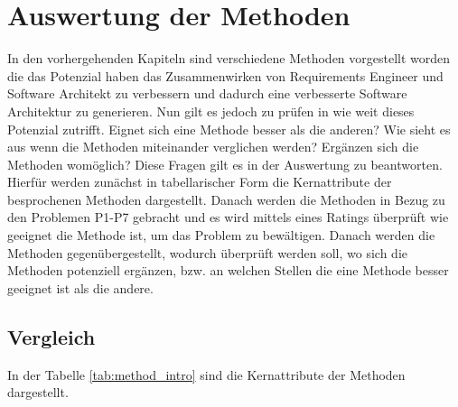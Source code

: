 \section{Auswertung der Methoden}\label{auswertung}
In den vorhergehenden Kapiteln sind verschiedene Methoden vorgestellt worden die das Potenzial haben das Zusammenwirken von Requirements Engineer und Software Architekt zu verbessern und dadurch eine verbesserte Software Architektur zu generieren. Nun gilt es jedoch zu prüfen in wie weit dieses Potenzial zutrifft. Eignet sich eine Methode besser als die anderen? Wie sieht es aus wenn die Methoden miteinander verglichen werden? Ergänzen sich die Methoden womöglich? Diese Fragen gilt es in der Auswertung zu beantworten.\\

Hierfür werden zunächst in tabellarischer Form die Kernattribute der besprochenen Methoden dargestellt. Danach werden die Methoden in Bezug zu den Problemen P1-P7 gebracht und es wird mittels eines Ratings überprüft wie geeignet die Methode ist, um das Problem zu bewältigen. Danach werden die Methoden gegenübergestellt, wodurch überprüft werden soll, wo sich die Methoden potenziell ergänzen, bzw. an welchen Stellen die eine Methode besser geeignet ist als die andere.\\ 

\subsection{Vergleich}
In der Tabelle \ref{tab:method_intro} sind die Kernattribute der Methoden dargestellt.\\

